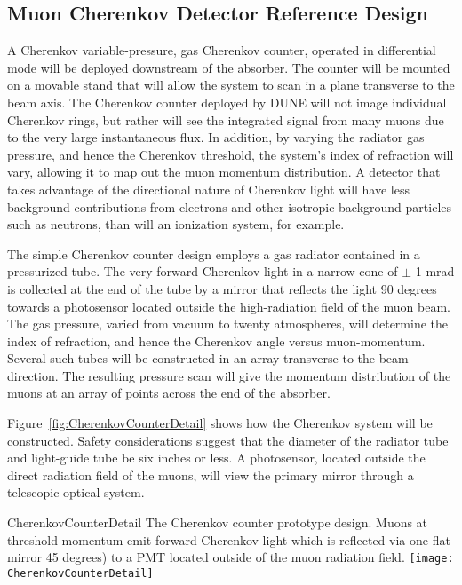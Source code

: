 %
%
\subsection{Muon Cherenkov Detector Reference Design} %
\label{sec:nd-blm-muon-cherenkov}

A Cherenkov variable-pressure, gas Cherenkov counter, operated in differential mode
will be deployed downstream of the absorber.  The counter will be mounted on a movable 
stand that will allow the system to scan in a plane transverse to the beam axis. 
The Cherenkov counter deployed by DUNE will not image individual Cherenkov rings, but rather will see the integrated signal from many muons due to the very large instantaneous flux. 
In addition, by varying the radiator gas pressure, and hence the 
Cherenkov threshold, the system's index of refraction will vary, 
allowing it to map out the muon momentum distribution.
A detector that takes advantage of the directional nature of Cherenkov
light will have less background contributions from electrons and other isotropic 
background particles such as neutrons, than will an ionization system, for example. 

The simple Cherenkov counter design
employs a gas radiator contained in a pressurized tube. The very forward
Cherenkov light in a narrow cone of $\pm$ 1 mrad is collected at the end of the tube
by a mirror that reflects the light 90 degrees towards a photosensor
located outside the high-radiation field of the muon beam. The gas
pressure, varied from vacuum to twenty atmospheres, will determine
the index of refraction, and hence the Cherenkov angle versus muon-momentum. 
Several such tubes will be constructed in an array
transverse to the beam direction. The resulting pressure scan will
give the momentum distribution of the muons at an array of points
across the end of the absorber.  

Figure~\ref{fig:CherenkovCounterDetail} shows how the
Cherenkov system will be constructed. Safety considerations suggest that the
diameter of the radiator tube and light-guide tube be six inches
or less.  A 
photosensor, located outside the direct radiation field of the muons, will
view the primary mirror through a telescopic optical system.

\begin{cdrfigure}{CherenkovCounterDetail}
{The Cherenkov counter prototype design. 
Muons at threshold momentum emit forward Cherenkov light which is
reflected via one flat mirror 45 degrees) to a PMT located outside of the muon
radiation field.}
\texttt{[image: CherenkovCounterDetail]}
\end{cdrfigure}

